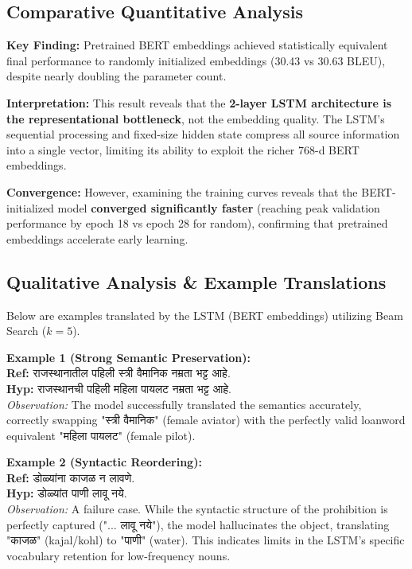 \documentclass[11pt, a4paper]{article}
\begin{document}
\subsection{Comparative Quantitative Analysis}
\textbf{Key Finding:} Pretrained BERT embeddings achieved statistically equivalent final performance to randomly initialized embeddings (30.43 vs 30.63 BLEU), despite nearly doubling the parameter count.

\textbf{Interpretation:} This result reveals that the \textbf{2-layer LSTM architecture is the representational bottleneck}, not the embedding quality. The LSTM's sequential processing and fixed-size hidden state compress all source information into a single vector, limiting its ability to exploit the richer 768-d BERT embeddings.

\textbf{Convergence:} However, examining the training curves reveals that the BERT-initialized model \textbf{converged significantly faster} (reaching peak validation performance by epoch 18 vs epoch 28 for random), confirming that pretrained embeddings accelerate early learning.

\subsection{Qualitative Analysis \& Example Translations}
Below are examples translated by the LSTM (BERT embeddings) utilizing Beam Search ($k=5$). 
\vspace{0.5cm}

\noindent \textbf{Example 1 (Strong Semantic Preservation):} \\
\textbf{Ref:} {\textmarathi{राजस्थानातील पहिली स्त्री वैमानिक नम्रता भट्ट आहे.}} \\
\textbf{Hyp:} {\textmarathi{राजस्थानची पहिली महिला पायलट नम्रता भट्ट आहे.}} \\
\textit{Observation:} The model successfully translated the semantics accurately, correctly swapping "स्त्री वैमानिक" (female aviator) with the perfectly valid loanword equivalent "महिला पायलट" (female pilot).

\vspace{0.3cm}
\noindent \textbf{Example 2 (Syntactic Reordering):} \\
\textbf{Ref:} {\textmarathi{डोळ्यांना काजळ न लावणे.}} \\
\textbf{Hyp:} {\textmarathi{डोळ्यांत पाणी लावू नये.}} \\
\textit{Observation:} A failure case. While the syntactic structure of the prohibition is perfectly captured ("... लावू नये"), the model hallucinates the object, translating "काजळ" (kajal/kohl) to "पाणी" (water). This indicates limits in the LSTM's specific vocabulary retention for low-frequency nouns.
\end{document}

